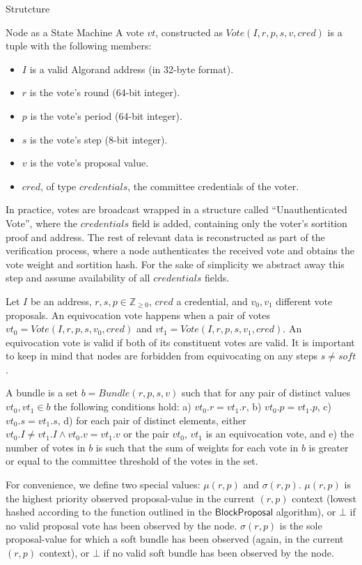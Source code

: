 \documentclass[10pt,a4paper]{article}
\begin{document}
\begin{section}{Strutcture}
\begin{subsection}{Node as a State Machine}
A vote $vt$, constructed as $Vote(I,r,p,s,v,cred)$ is a tuple with the following members:
\begin{itemize}
    \item $I$ is a valid Algorand address (in 32-byte format).
    \item $r$ is the vote's round (64-bit integer).
    \item $p$ is the vote's period (64-bit integer).
    \item $s$ is the vote's step (8-bit integer).
    \item $v$ is the vote's proposal value.
    \item $cred$, of type $credentials$, the committee credentials of the voter.
\end{itemize}

In practice, votes are broadcast wrapped in a structure called ``Unauthenticated Vote'', 
where the $credentials$ field is added, containing only the voter's sortition proof and 
address.
The rest of relevant data is reconstructed as part of the verification process, 
where a node authenticates the received vote and obtains the vote weight and sortition hash.
For the sake of simplicity we abstract away this step and assume availability of all 
$credentials$ fields.


Let $I$ be an address, $r, s, p\in\mathbb{Z}_{\ge 0}$, $cred$ a credential, and $v_0,v_1$ different
vote proposals.
An {\sf equivocation vote} happens when a pair of votes
$vt_0 = Vote(I, r, p, s, v_0, cred)$ and $vt_1 = Vote(I, r, p, s, v_1, cred)$.
An equivocation vote is valid if both of its constituent votes are valid.
It is important to keep in mind that nodes are forbidden from equivocating 
on any steps $s \neq soft$.

A {\sf bundle} is a set $b = Bundle(r,p,s,v)$ such that for any pair of distinct values 
$vt_0, vt_1 \in b$ the following conditions hold: 
a) $vt_0.r = vt_1.r $, 
b) $vt_0.p = vt_1.p$,
c) $vt_0.s = vt_1.s$,
d) for each pair of distinct elements, either $vt_0.I \neq vt_1.I \land vt_0.v = vt_1.v$ or the pair $vt_0$, $vt_1$ 
is an equivocation vote, and
e) the number of votes in $b$ is such that the sum of weights for each vote in $b$ is greater or equal to the
committee threshold of the votes in the set.

For convenience, we define two special values: $\mu(r,p)$ and $\sigma(r,p)$.
$\mu(r,p)$ is the highest priority observed proposal-value in the current $(r,p)$ context 
(lowest hashed according to the function outlined in the $\mathsf{BlockProposal}$ algorithm), 
or $\bot$ if no valid proposal vote has been observed by the node.
$\sigma(r,p)$ is the sole proposal-value for which a soft bundle has been observed (again, 
in the current $(r,p)$ context), or $\bot$ if no valid soft bundle has been observed by the 
node.
\end{subsection}

\end{section}
\end{document}
